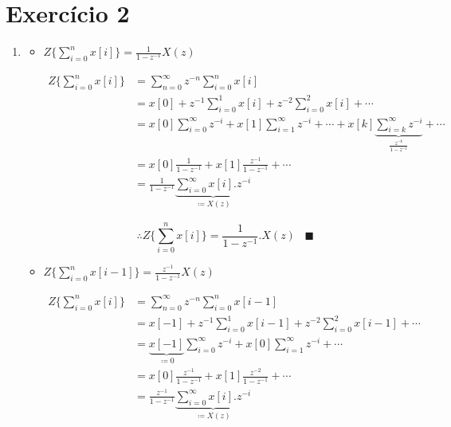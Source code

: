 \documentclass{article}
\begin{document}
\section*{Exercício 2}
\begin{enumerate}
\item %

\begin{itemize}
	\item $Z\{\sum_{i=0}^{n}x[i] \} = \frac{1}{1-z^{-1}}X(z)$
	
	\begin{equation}
	\begin{split}
	Z\{\sum_{i=0}^{n}x[i] \} & = \sum_{n=0}^{\infty} z^{-n} \sum_{i=0}^{n} x[i] \\
	& = x[0] + z^{-1} \sum_{i=0}^{1} x[i] + z^{-2} \sum_{i=0}^{2} x[i] + \cdots \\
	& = x[0] \sum_{i=0}^{\infty} z^{-i} + x[1] \sum_{i=1}^{\infty} z^{-i} + \cdots + x[k] 
	\underbrace{\sum_{i=k}^{\infty} z^{-i}}_{\frac{z^{-k}}{1 - z^{-1}}} + \cdots\\
	& = x[0] \frac{1}{1 - z^{-1}} + x[1] \frac{z^{-1}}{1 - z^{-1}} + \cdots \\
	& = \frac{1}{1 - z^{-1}} \underbrace{\sum_{i=0}^{\infty} x[i].z^{-i}}_{\coloneqq X(z)}
	\end{split}
	\end{equation}

	\begin{equation}
	\therefore Z\{\sum_{i=0}^{n}x[i] \} = \frac{1}{1-z^{-1}}.X(z) \hspace{10pt} \blacksquare
	\end{equation}
	
	\item $Z\{\sum_{i=0}^{n}x[i-1] \} = \frac{z^{-1}}{1-z^{-1}}X(z)$

	\begin{equation}
	\begin{split}
	Z\{\sum_{i=0}^{n}x[i] \} & = \sum_{n=0}^{\infty} z^{-n} \sum_{i=0}^{n} x[i-1] \\
	& = x[-1] + z^{-1} \sum_{i=0}^{1} x[i-1] + z^{-2} \sum_{i=0}^{2} x[i-1] + \cdots \\
	& = \underbrace{x[-1]}_{\coloneqq 0} \sum_{i=0}^{\infty} z^{-i} + x[0] \sum_{i=1}^{\infty} z^{-i} + \cdots \\
	& = x[0] \frac{z^{-1}}{1 - z^{-1}} + x[1] \frac{z^{-2}}{1 - z^{-1}} + \cdots \\
	& = \frac{z^{-1}}{1 - z^{-1}} \underbrace{\sum_{i=0}^{\infty} x[i].z^{-i}}_{\coloneqq X(z)}
	\end{split}
	\end{equation}


\end{itemize}
\end{enumerate}
\end{document}
